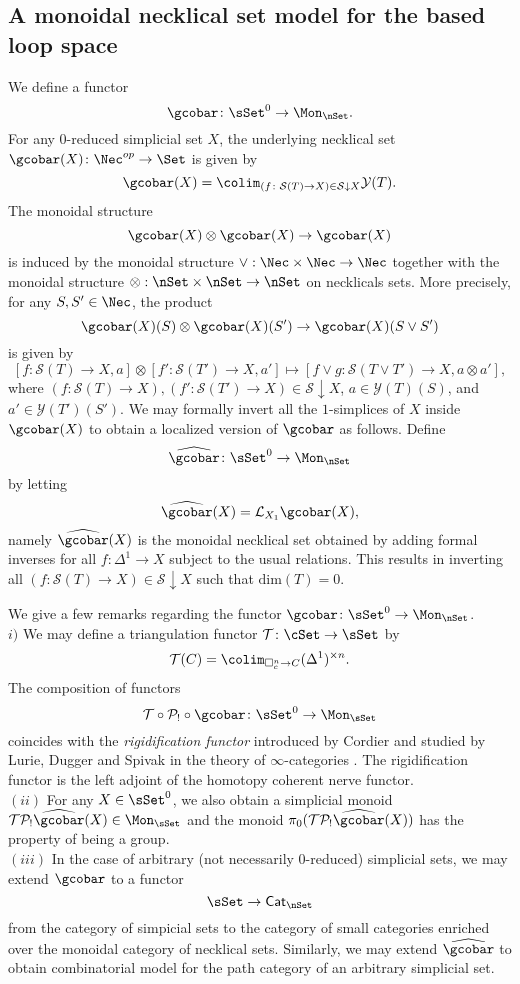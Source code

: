 \subsection{A monoidal necklical set model for the based loop space}
We define a functor 
$$\gcobar \colon \sSet^0 \to \Mon_{\nSet}.$$
For any $0$-reduced simplicial set $X$, the underlying necklical set $\gcobar(X) \colon \Nec^{op} \to \Set$ is given by
$$\gcobar(X) = \colim_{(f \colon \mathcal{S}(T) \to X) \in  \mathcal{S} \downarrow X} \mathcal{Y}(T).$$
The monoidal structure $$\gcobar(X) \otimes \gcobar(X) \to \gcobar(X)$$
is induced by the monoidal structure $\vee: \Nec \times \Nec \to \Nec$ together with the monoidal structure $\otimes: \nSet \times \nSet \to \nSet$ on necklicals sets. More precisely, for any $S, S' \in \Nec$, the product $$\gcobar(X)(S) \otimes \gcobar(X)(S') \to \gcobar(X)(S \vee S')$$ is given by $$[f\colon \mathcal{S}(T) \to X, a] \otimes [f'\colon \mathcal{S}(T') \to X, a'] \mapsto [f \vee g\colon \mathcal{S}(T\vee T') \to X, a \otimes  a'],$$
where $(f\colon \mathcal{S}(T) \to X), (f'\colon \mathcal{S}(T') \to X) \in \mathcal{S} \downarrow X$, $a\in \mathcal{Y}(T)(S)$, and $a'\in \mathcal{Y}(T')(S')$.
We may formally invert all the $1$-simplices of $X$ inside $\gcobar(X)$ to obtain a localized version of $\gcobar$ as follows. Define 
$$\widehat{\gcobar} \colon \sSet^0 \to \Mon_{\nSet}$$
by letting
$$\widehat{\gcobar}(X)= \mathcal{L}_{X_1}\gcobar(X),$$
namely $\widehat{\gcobar}(X)$ is the monoidal necklical set obtained by adding formal inverses for all $f\colon \Delta^1 \to X$ subject to the usual relations. This results in inverting all $(f: \mathcal{S}(T) \to X) \in \mathcal{S} \downarrow X$ such that $\text{dim}(T)=0.$

\begin{remark}
We give a few remarks regarding the functor $\gcobar \colon \sSet^0 \to \Mon_{\nSet}$.
\\
$i)$ We may define a triangulation functor $\mathcal{T} \colon \cSet \to \sSet$ by $$\mathcal{T}(C) = \colim_{\square^n_c \to C} (\Delta^1)^{\times n}.$$
The composition of functors
$$\mathcal{T} \circ \mathcal{P}_! \circ  \gcobar\colon \sSet^0 \to \Mon_{\sSet}$$ coincides with the \textit{rigidification functor} introduced by Cordier and studied by Lurie, Dugger and Spivak in the theory of $\infty$-categories \cite{Rivera-Zeinalian}. The rigidification functor is the left adjoint of the homotopy coherent nerve functor. 
\\
$(ii)$ For any $X \in \sSet^0$, we also obtain a simplicial monoid $\mathcal{T}\mathcal{P}_! \widehat{\gcobar}(X) \in \Mon_{\sSet}$ and the monoid $\pi_0( \mathcal{T}\mathcal{P}_! \widehat{\gcobar}(X))$ has the property of being a group.
\\
$(iii)$ In the case of arbitrary (not necessarily $0$-reduced) simplicial sets, we may extend  $\gcobar$ to a functor
$$\sSet \to \mathsf{Cat}_{\nSet}$$ from the category of simpicial sets to the category of small categories enriched over the monoidal category of necklical sets. Similarly, we may extend $\widehat{\gcobar}$ to obtain combinatorial model for the path category of an arbitrary simplicial set.
\end{remark}

